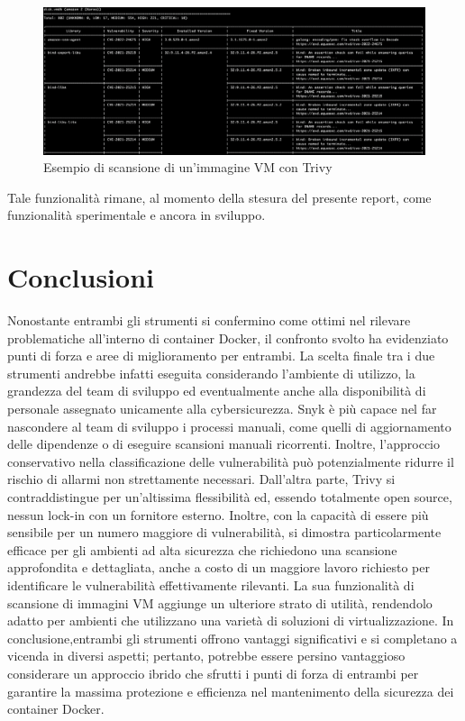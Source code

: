 \begin{figure}[H]
   \centering
   \includegraphics[width=1\textwidth]{immagini/capitolo2/trivy_vm.png}
   \caption{Esempio di scansione di un'immagine VM con Trivy}
   \label{fig:trivy_vm}
\end{figure}
Tale funzionalità rimane, al momento della stesura del presente report, come funzionalità sperimentale e ancora in sviluppo.

\section{Conclusioni}
Nonostante entrambi gli strumenti si confermino come ottimi nel rilevare problematiche all'interno di container Docker, il confronto svolto ha evidenziato punti di forza e aree di miglioramento per entrambi. La scelta finale tra i due strumenti andrebbe infatti eseguita considerando l'ambiente di utilizzo, la grandezza del team di sviluppo ed eventualmente anche alla disponibilità di personale assegnato unicamente alla cybersicurezza. Snyk è più capace nel far nascondere al team di sviluppo i processi manuali, come quelli di aggiornamento delle dipendenze o di eseguire scansioni manuali ricorrenti. Inoltre, l'approccio conservativo nella classificazione delle vulnerabilità può potenzialmente ridurre il rischio di allarmi non strettamente necessari. Dall'altra parte, Trivy si contraddistingue per un'altissima flessibilità ed, essendo totalmente open source, nessun lock-in con un fornitore esterno. Inoltre, con la capacità di essere più sensibile per un numero maggiore di vulnerabilità, si dimostra particolarmente efficace per gli ambienti ad alta sicurezza che richiedono una scansione approfondita e dettagliata, anche a costo di un maggiore lavoro richiesto per identificare le vulnerabilità effettivamente rilevanti. La sua funzionalità di scansione di immagini VM aggiunge un ulteriore strato di utilità, rendendolo adatto per ambienti che utilizzano una varietà di soluzioni di virtualizzazione. In conclusione,entrambi gli strumenti offrono vantaggi significativi e si completano a vicenda in diversi aspetti; pertanto, potrebbe essere persino vantaggioso considerare un approccio ibrido che sfrutti i punti di forza di entrambi per garantire la massima protezione e efficienza nel mantenimento della sicurezza dei container Docker.